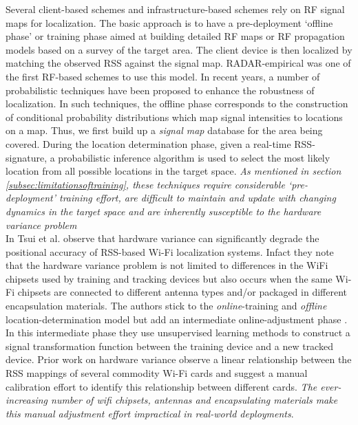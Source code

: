  Several client-based schemes and infrastructure-based schemes rely on RF signal maps for localization.  The basic approach is to have a pre-deployment `offline phase' or training phase aimed at building detailed RF maps or RF propagation models based on a survey of the target area. The client device is then localized by matching the observed RSS against the signal map. RADAR-empirical \cite{Bahl00radar:an} was one of the first RF-based schemes to use this model. In recent years, a number of probabilistic techniques \cite{Youssef:2008:HLD:1399551.1399558, Ladd:2002:RLS:570645.570674, Haeberlen:2004:PRL:1023720.1023728} have been proposed to enhance the robustness of localization. In such techniques, the offline phase corresponds to the construction of conditional  probability distributions which map signal intensities to locations on a map.  Thus, we first build up a {\it signal map} database for the area being covered. During the location determination phase, given a real-time RSS-signature,  a probabilistic inference algorithm is used to select the most likely location from all possible locations in the target space. { \it As mentioned in section \ref{subsec:limitationsoftraining}, these techniques require considerable `pre-deployment' training effort, are difficult to maintain and update with changing dynamics in the target space and are inherently susceptible to the hardware variance problem \cite{Tsui:2009:ULS:1741410.1741596} }\\


 In \cite{Tsui:2009:ULS:1741410.1741596} Tsui et al. observe that hardware variance can significantly degrade the positional accuracy of RSS-based Wi-Fi localization systems. Infact they note that the hardware variance problem is not limited to differences in the WiFi chipsets used by training and tracking devices but also occurs when the same Wi-Fi chipsets are connected to different antenna types and/or packaged in different encapsulation materials. The authors stick to the {\it online}-training and {\it offline} location-determination model but add an intermediate online-adjustment phase . In this intermediate phase they use unsupervised learning methods to construct a signal transformation function between the training device and a new tracked device. Prior work on hardware variance \cite{Haeberlen:2004:PRL:1023720.1023728} observe a linear 
relationship between the RSS mappings of several commodity Wi-Fi cards and suggest a manual calibration effort to identify this relationship between different cards. {\it The ever-increasing number of wifi chipsets, antennas and encapsulating materials make this manual adjustment effort impractical in real-world deployments}.

